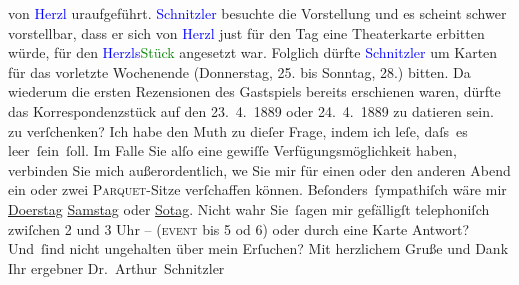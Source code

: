 {{{                  von \textcolor{blue}{Herzl} uraufgeführt. \textcolor{blue}{Schnitzler} besuchte die 
                  Vorstellung und es scheint schwer vorstellbar, dass er sich von \textcolor{blue}{Herzl} just für den Tag
                  eine Theaterkarte erbitten würde, für den \textcolor{blue}{Herzls}\textcolor{green}{Stück} angesetzt war. Folglich dürfte \textcolor{blue}{Schnitzler} 
                  um Karten für das vorletzte Wochenende (Donnerstag, 25. bis Sonntag, 28.) bitten. Da wiederum die ersten Rezensionen
                  des Gastspiels bereits erschienen waren, dürfte das Korrespondenzstück auf den 23. 4. 1889 oder
                  24. 4. 1889 zu datieren sein.}}}\label{K_L03917-1} zu
               verſchenken? Ich habe den Muth zu dieſer Frage, indem ich leſe, daſs es
               leer ſein ſoll. Im Falle Sie alſo eine gewiſſe Verfügungsmöglichkeit haben, verbinden
                  {\pb}Sie mich außerordentlich, we{\geminationn} Sie mir für einen oder
               den anderen Abend ein oder zwei \introOben{}\textsc{Parquet-}\introOben{}Sitze verſchaffen können. Beſonders ſympathiſch wäre mir \uline{Do{\geminationn}erstag}{ }\uline{Samstag} oder \uline{So{\geminationn}tag}. Nicht wahr Sie ſagen mir gefälligſt telephoniſch zwiſchen 2 und 3 Uhr \introOben{}–
                  (\textsc{event} bis 5 od 6)\introOben{} oder durch eine Karte Antwort? Und ſind nicht ungehalten
               über mein Erſuchen?\pend
           \pstart Mit herzlichem Gruße und Dank Ihr ergebner
               \spacefill\mbox{Dr. Arthur Schnitzler}\pend{}\endnumbering{}
\begin{anhang}
\end{anhang}\newcommand{\dateiname}{L03917}\newcommand{\titel}{Arthur Schnitzler an Theodor Herzl, [23. oder 24. 4. 1889?]}\newcommand{\editorInnen}{Herausgegeben von Jahnke, SelmaMüller, Martin Anton}
